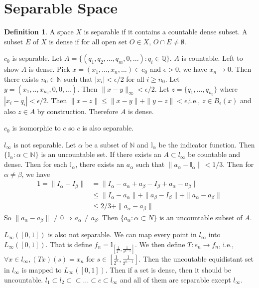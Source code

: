 \documentclass[a4paper, 11pt]{article}
\newcommand{\Q}{\mathbb{Q}}
\newcommand{\N}{\mathbb{N}}
\theoremstyle{definition}
\newtheorem{definition}[theorem]{Definition}
\begin{document}
\section{Separable Space}
\begin{definition}
A space $X$ is separable if it contains a countable dense subset. A subset $E$ of $X$ is dense if for all open set $O\in X$, $O \cap E\neq \emptyset$.
\end{definition}
$c_0$ is separable. Let $A=\{(q_1,q_2,...,q_m,0,...): q_i \in \Q\}$. $A$ is countable. Left to show $A$ is dense. Pick $x=(x_1,...,x_n,...)\in c_0$ and $\epsilon>0$, we have
$x_n\to 0$. Then there exists $n_0\in \N$ such that $|x_i|<\epsilon/2$ for all $i\ge n_0$. Let $y=(x_1,..,x_{n_0},0,0,...)$. Then $\|x-y\|_\infty < \epsilon/2$. Let $z=\{q_1,...,q_{n_0}\}$ where 
$|x_i-q_i|<\epsilon/2$. Then $\|x-z\|\le\|x-y\|+\|y-z\|<\epsilon$,i.e., $z\in B_\epsilon(x)$ and also $z\in A$ by construction. Therefore $A$ is dense.

$c_0$ is isomorphic to $c$ so $c$ is also separable.

$l_\infty$ is not separable. Let $\alpha$ be a subset of $\N$ and $\mathbb I_\alpha$ be the indicator function. Then $\{\mathbb I_\alpha: \alpha\subset \N\}$ is an 
uncountable set. If there exists an $A\subset l_\infty$ be countable and dense. Then for each $\mathbb I_\alpha$, there exists an $a_\alpha$ such that 
$\|a_\alpha-\mathbb I_\alpha\|<1/3$. Then for $\alpha\neq \beta$, we have
\begin{align*}
    1=\|I_\alpha-I_\beta\|&=\|I_\alpha-a_\alpha+a_\beta - I_\beta+a_\alpha-a_\beta\|\\
    &\le \|I_\alpha-a_\alpha\| + \|a_\beta - I_\beta\|+\|a_\alpha-a_\beta\|\\
    &\le 2/3 + \|a_\alpha-a_\beta\|
\end{align*}
So $\|a_\alpha-a_\beta\|\neq 0 \Rightarrow a_\alpha\neq a_\beta$. Then $\{a_\alpha: \alpha \subset N\}$ is an uncountable subset of $A$.

$L_\infty([0,1])$ is also not separable. We can map every point in $l_\infty$ into $L_\infty([0,1])$. That is define $f_n = \mathbb I_{[\frac{1}{2^{n}}, \frac{1}{2^{n-1}}]}$. 
We then define $T:e_n\to f_n$, i.e., $\forall x \in l_\infty,(Tx)(s)=x_n$ for $s\in [\frac{1}{2^{n}}, \frac{1}{2^{n-1}}]$. Then the uncoutable equidistant set in $l_\infty$ 
is mapped to $L_\infty([0,1])$. Then if a set is dense, then it should be uncountable. $l_1\subset l_2\subset \subset...\subset c\subset l_\infty$ and all of them are 
separable except $l_\infty$.
\end{document}
